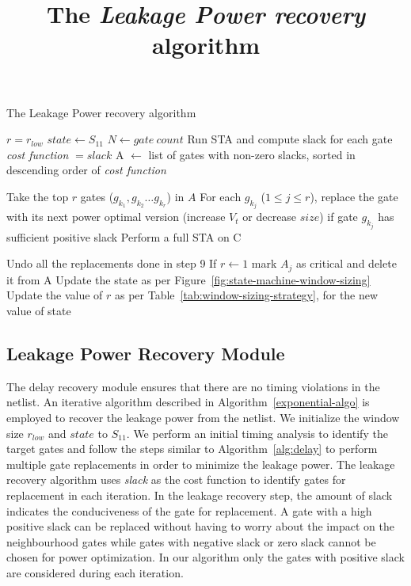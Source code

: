 \begin{algorithm}[!t]
  \scriptsize
 \LinesNumbered
 \title{The {\it Leakage Power recovery } algorithm}
 \caption{The Leakage Power recovery algorithm}
 \label{exponential-algo}
  $r = r_{low}$\; 
  $state\leftarrow S_{11}$\;
 $N \leftarrow gate\ count$\;
  Run STA and compute slack for each gate\;
    \textit{cost function} $=slack$\;
 A $\leftarrow$ list of gates with non-zero slacks, sorted in descending order of \textit{cost function}\; 
    {
    Take the top $r$ gates ($g_{k_1}, g_{k_2} \ldots g_{k_r}$) in $A$ \;
     For each $g_{k_j}$ ($1 \le j \le r$), replace the gate with its next power optimal version  (increase $V_t$ or decrease $size$) if gate $g_{k_j}$ has sufficient positive slack\;
      Perform a full STA on C\;
       {
          Undo all the replacements done in step 9\;
          If $r\leftarrow1$ mark $A_{j}$ as critical and delete it from A\;
            Update the state as per Figure~\ref{fig:state-machine-window-sizing}\;
      Update the value of $r$ as per Table~\ref{tab:window-sizing-strategy}, for the new value of state\;

      }
    }
 \end{algorithm}




\subsection {Leakage Power Recovery Module}
The delay recovery module ensures that there are no timing violations in the netlist. An iterative algorithm described in Algorithm~\ref{exponential-algo} is employed to recover the leakage power from the netlist. We initialize the window size $r_{low}$ and $state$ to $S_{11}$.  We perform an initial timing analysis to identify the target gates and follow the steps similar to Algorithm~\ref{alg:delay} to perform multiple gate replacements in order to minimize the leakage power. The leakage recovery algorithm uses \textit{slack} as the cost function to identify gates for replacement in each iteration. In the leakage recovery step, the amount of slack indicates the conduciveness of the gate for replacement.  A gate with a high positive slack  can be replaced without having to worry about the impact on the neighbourhood gates while gates with negative slack or zero slack cannot be chosen for power optimization.  In our algorithm only the gates with positive slack are considered during each iteration.

